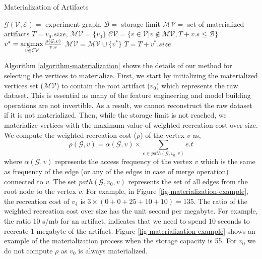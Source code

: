 \begin{algorithm}[h]
\caption{Materialization of Artifacts}\label{algorithm-materialization}
\begin{algorithmic}[1]
\Require  $\mathcal{G(V,E)}=$ experiment graph, $\mathcal{B}=$ storage limit
\Ensure $\mathcal{MV}=$ set of materialized artifacts
\State $T=v_0.size$, $\mathcal{MV} =\{v_0\}$
\Do 
	\State $\mathcal{CV} = \{v \in \mathcal{V} \lvert v \notin \mathcal{MV}, T + v.s \leq \mathcal{B}\}$
	\State $v^* = \operatorname*{argmax}\limits_{v \in \mathcal{CV}} \tfrac{\rho(\mathcal{G}, v)}{v.s}$
	\State $\mathcal{MV} = \mathcal{MV} \cup \{v^*\}$
	\State $T = T + v^*.size$
\end{algorithmic}
\end{algorithm}
Algorithm \ref{algorithm-materialization} shows the details of our method for selecting the vertices to materialize.
First, we start by initializing the materialized vertices set ($\mathcal{MV}$) to contain the root artifact ($v_0$) which represents the raw dataset.
This is essential as many of the feature engineering and model building operations are not invertible.
As a result, we cannot reconstruct the raw dataset if it is not materialized.
Then, while the storage limit is not reached, we materialize vertices with the maximum value of weighted recreation cost over size.
We compute the weighted recreation cost ($\rho$) of the vertex $v$ as, 
\[
\rho(\mathcal{G}, v) = \alpha(\mathcal{G}, v) \times \sum\limits_{e \in path(\mathcal{G}, v_0, v)}  e.t
\]
where $\alpha(\mathcal{G}, v)$ represents the access frequency of the vertex $v$ which is the same as frequency of the edge (or any of the edges in case of merge operation) connected to $v$.
The set $path(\mathcal{G}, v_0, v)$ represents the set of all edges from the root node to the vertex $v$. 
For example, in Figure \ref{fig-materialization-example}, the recreation cost of $v_4$ is $3 \times (0 + 0 + 25 + 10 + 10) = 135$.
The ratio of the weighted recreation cost over size has the unit second per megabyte.
For example, the ratio 10 s/mb for an artifact, indicates that we need to spend 10 seconds to recreate 1 megabyte of the artifact.
Figure \ref{fig-materialization-example} shows an example of the materialization process when the storage capacity is 55.
For $v_0$ we do not compute $\rho$ as $v_0$ is always materialized.

